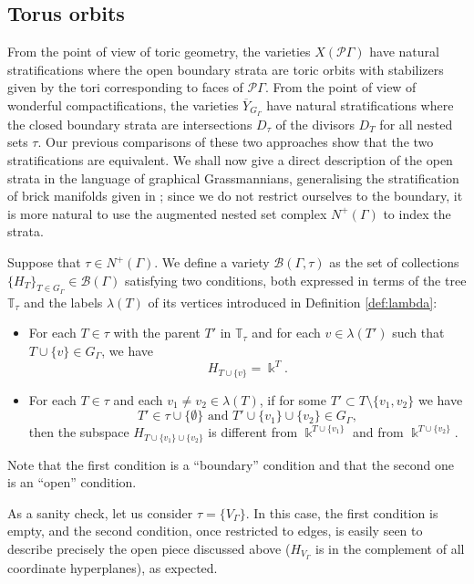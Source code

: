 \documentclass[11pt]{article}
\theoremstyle{definition}
\numberwithin{equation}{section}
\newcommand\calB{\mathcal{B}}
\newcommand\calP{\mathcal{P}}
\newcommand\kk{\Bbbk}
\begin{document}
\subsection{Torus orbits} \label{sec:toric-orbits}
From the point of view of toric geometry, the varieties $X(\calP\Gamma)$ have natural stratifications where the open boundary strata are toric orbits with stabilizers given by the tori corresponding to faces of $\calP\Gamma$. From the point of view of wonderful compactifications, the varieties $\overline{Y}_{G_\Gamma}$ have natural stratifications where the closed boundary strata are intersections $D_\tau$ of the divisors $D_T$ for all nested sets $\tau$. Our previous comparisons of these two approaches show that the two stratifications are equivalent. We shall now give a direct description of the open strata in the language of graphical Grassmannians, generalising the stratification of brick manifolds given in \cite[Def.5.1.4]{MR4072173}; since we do not restrict ourselves to the boundary, it is more natural to use the augmented nested set complex $N^+(\Gamma)$ to index the strata. 

Suppose that $\tau\in N^+(\Gamma)$. We define a variety $\calB(\Gamma,\tau)$ as the set of collections $\{H_T\}_{T\in G_\Gamma}\in \calB(\Gamma)$ satisfying two conditions, both expressed in terms of the tree $\mathbb{T}_\tau$ and the labels $\lambda(T)$ of its vertices introduced in Definition \ref{def:lambda}:  
\begin{itemize}
\item For each $T\in\tau$ with the parent $T'$ in $\mathbb{T}_\tau$ and for each $v\in \lambda(T')$ such that $T\cup\{v\}\in G_\Gamma$, we have 
 \[
H_{T\cup\{v\}}=\kk^{T}.
 \] 
\item For each $T\in\tau$ and each $v_1\ne v_2\in \lambda(T)$, 
if for some $T'\subset T\setminus\{v_1,v_2\}$ we have 
 \[
T'\in \tau\cup\{\emptyset\}\text{  and } T'\cup\{v_1\}\cup\{v_2\}\in G_\Gamma,
 \] 
then the subspace $H_{T\cup\{v_1\}\cup\{v_2\}}$ is different from $\kk^{T\cup\{v_1\}}$ and from $\kk^{T\cup\{v_2\}}$.
\end{itemize}
Note that the first condition is a ``boundary'' condition and that the second one is an ``open'' condition.

As a sanity check, let us consider $\tau=\{V_\Gamma\}$. In this case, the first condition is empty, and the second condition, once restricted to edges, is easily seen to describe precisely the open piece discussed above ($H_{V_\Gamma}$ is in the complement of all coordinate hyperplanes), as expected.
\end{document}
